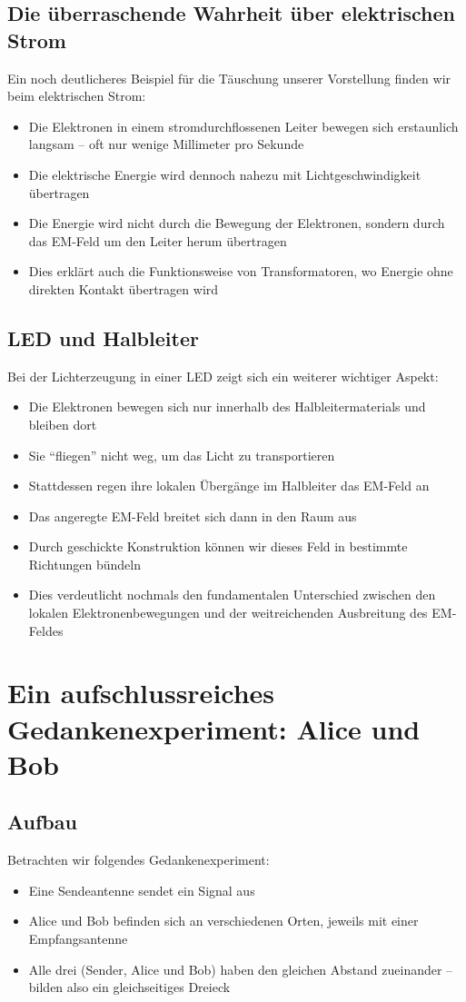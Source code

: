 \documentclass[12pt,a4paper]{article}
\begin{document}
\subsection{Die überraschende Wahrheit über elektrischen Strom}
Ein noch deutlicheres Beispiel für die Täuschung unserer Vorstellung finden wir beim elektrischen Strom:
\begin{itemize}
    \item Die Elektronen in einem stromdurchflossenen Leiter bewegen sich erstaunlich langsam -- oft nur wenige Millimeter pro Sekunde
    \item Die elektrische Energie wird dennoch nahezu mit Lichtgeschwindigkeit übertragen
    \item Die Energie wird nicht durch die Bewegung der Elektronen, sondern durch das EM-Feld um den Leiter herum übertragen
    \item Dies erklärt auch die Funktionsweise von Transformatoren, wo Energie ohne direkten Kontakt übertragen wird
\end{itemize}

\subsection{LED und Halbleiter}
Bei der Lichterzeugung in einer LED zeigt sich ein weiterer wichtiger Aspekt:
\begin{itemize}
    \item Die Elektronen bewegen sich nur innerhalb des Halbleitermaterials und bleiben dort
    \item Sie ``fliegen'' nicht weg, um das Licht zu transportieren
    \item Stattdessen regen ihre lokalen Übergänge im Halbleiter das EM-Feld an
    \item Das angeregte EM-Feld breitet sich dann in den Raum aus
    \item Durch geschickte Konstruktion können wir dieses Feld in bestimmte Richtungen bündeln
    \item Dies verdeutlicht nochmals den fundamentalen Unterschied zwischen den lokalen Elektronenbewegungen und der weitreichenden Ausbreitung des EM-Feldes
\end{itemize}
\section{Ein aufschlussreiches Gedankenexperiment: Alice und Bob}
\subsection{Aufbau}
Betrachten wir folgendes Gedankenexperiment:
\begin{itemize}
    \item Eine Sendeantenne sendet ein Signal aus
    \item Alice und Bob befinden sich an verschiedenen Orten, jeweils mit einer Empfangsantenne
    \item Alle drei (Sender, Alice und Bob) haben den gleichen Abstand zueinander -- bilden also ein gleichseitiges Dreieck
\end{itemize}
\end{document}
